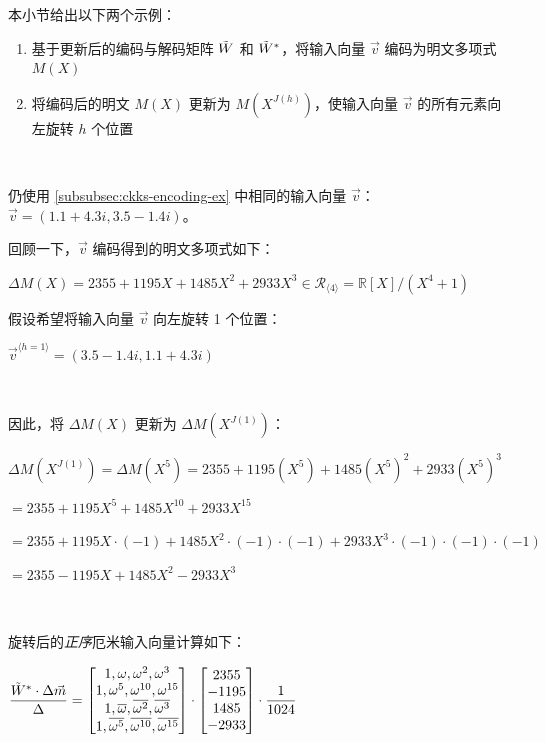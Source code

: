 本小节给出以下两个示例：
\begin{enumerate}
\item 基于更新后的编码与解码矩阵 $\tilde W$ 和 $\tilde W^*$，将输入向量 $\vec{v}$ 编码为明文多项式 $M(X)$
\item 将编码后的明文 $M(X)$ 更新为 $M(X^{J(h)})$，使输入向量 $\vec{v}$ 的所有元素向左旋转 $h$ 个位置
\end{enumerate}

$ $

仍使用 \autoref{subsubsec:ckks-encoding-ex} 中相同的输入向量 $\vec{v}$：$\vec{v} = (1.1 + 4.3i, 3.5 - 1.4i)$。

回顾一下，$\vec{v}$ 编码得到的明文多项式如下：

$\Delta M(X) = 2355 + 1195X + 1485X^2 + 2933X^3 \in \mathcal{R}_{\langle 4 \rangle}=\mathbb{R}[X]/(X^4+1)$


假设希望将输入向量 $\vec{v}$ 向左旋转 1 个位置：

$\vec{v}^{\langle h=1 \rangle} = (3.5 - 1.4i, 1.1 + 4.3i)$

$ $

因此，将 $\Delta M(X)$ 更新为 $\Delta M(X^{J(1)})$：

$\Delta M(X^{J(1)}) = \Delta M(X^{5}) = 2355 + 1195(X^5) + 1485(X^5)^2 + 2933(X^5)^3$

$= 2355 + 1195X^5 + 1485X^{10} + 2933X^{15}$

$= 2355 + 1195X\cdot(-1) + 1485X^{2}\cdot(-1)\cdot(-1) + 2933X^{3}\cdot(-1)\cdot(-1)\cdot(-1)$

$= 2355 - 1195X + 1485X^2 - 2933X^3$

$ $

旋转后的\textit{正序}厄米输入向量计算如下：

$\dfrac{\tilde W^* \cdot \Delta \vec{m}}{\Delta} = \begin{bmatrix}
1,\omega,\omega^2, \omega^3\\
1,\omega^5, \omega^{10},\omega^{15}\\
1,\overline{\omega}, \overline{\omega^2}, \overline{\omega^3}\\
1,\overline{\omega^5}, \overline{\omega^{10}}, \overline{\omega^{15}}
\end{bmatrix} \cdot \begin{bmatrix}
2355\\- 1195\\1485\\-2933
\end{bmatrix}\cdot \dfrac{1}{1024}$

